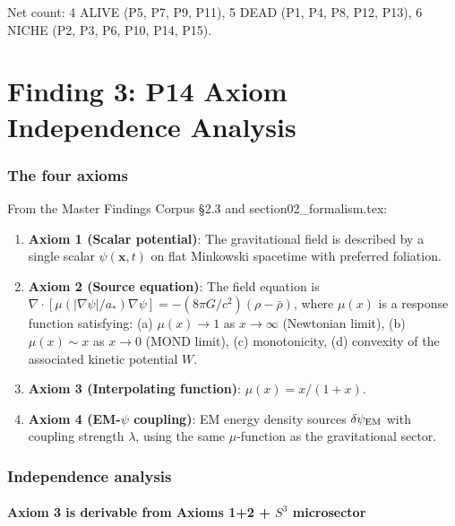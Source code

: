 \documentclass[11pt]{article}
\begin{document}
Net count: 4 ALIVE (P5, P7, P9, P11), 5 DEAD (P1, P4, P8, P12, P13),
6 NICHE (P2, P3, P6, P10, P14, P15).


\part{Finding 3: P14 Axiom Independence Analysis}
\label{part:p14}

\section{The four axioms}

From the Master Findings Corpus \S2.3 and section02\_formalism.tex:

\begin{enumerate}
\item \textbf{Axiom 1 (Scalar potential)}: The gravitational field
  is described by a single scalar $\psi(\mathbf{x},t)$ on flat
  Minkowski spacetime with preferred foliation.

\item \textbf{Axiom 2 (Source equation)}: The field equation is
  $\nabla\cdot[\mu(|\nabla\psi|/a_*)\nabla\psi] =
  -(8\pi G/c^2)(\rho - \bar\rho)$, where $\mu(x)$ is a response
  function satisfying: (a) $\mu(x) \to 1$ as $x \to \infty$
  (Newtonian limit), (b) $\mu(x) \sim x$ as $x \to 0$ (MOND limit),
  (c) monotonicity, (d) convexity of the associated kinetic potential
  $W$.

\item \textbf{Axiom 3 (Interpolating function)}: $\mu(x) = x/(1+x)$.

\item \textbf{Axiom 4 (EM-$\psi$ coupling)}: EM energy density sources
  $\delta\psi_{\rm EM}$ with coupling strength $\lambda$, using the
  same $\mu$-function as the gravitational sector.
\end{enumerate}

\section{Independence analysis}

\subsection{Axiom 3 is derivable from Axioms 1+2 + $S^3$ microsector}
\end{document}
